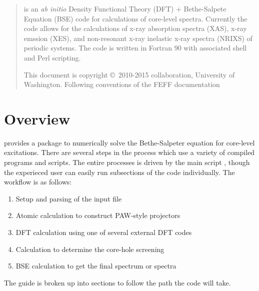 \documentclass[11pt]{report}
\begin{document}
\MakeTitle

\newchapter{}
\begin{abstract}
 is an {\it ab initio} Density Functional Theory (DFT) + Bethe-Salpete Equation (BSE) code for calculations of core-level 
spectra. Currently the code allows for the calculations of x-ray absorption spectra (XAS), x-ray emssion (XES), and non-resonant x-ray 
inelastic x-ray spectra (NRIXS) of periodic systems. The code is written in Fortran 90 with associated shell and Perl scripting.




 \noindent This document is copyright \copyright\ 2010-2015  collaboration, University of Washington. Following conventions of the FEFF documentation

\end{abstract}

\newchapter{}
\tableofcontents
\newchapter{}

\setcounter{page}{1}


\chapter{Overview}



 provides a package to numerically solve the Bethe-Salpeter equation for core-level excitations. 
There are several steps in the process which use a variety of compiled programs and scripts. 
The entire processes is driven by the main script , though the experieced user 
can easily run subsections of the code individually.
The  workflow is as follows:

\begin{enumerate}
\item Setup and parsing of the input file
\item Atomic calculation to construct PAW-style projectors
\item DFT calculation using one of several external DFT codes
\item Calculation to determine the core-hole screening
\item BSE calculation to get the final spectrum or spectra
\end{enumerate}

The guide is broken up into sections to follow the path the code will take. 
\end{document}
